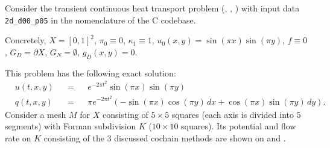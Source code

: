 \begin{example}
  \label{cmc/diffusion/continuous/transient/examples/2d_d00_p05-example}
  Consider the transient continuous heat transport problem
  (,
   ,
   )
  with input data \verb|2d_d00_p05| in the nomenclature of the C codebase.

  Concretely,
    $X = [0, 1]^2$,
    $\pi_0 \equiv 0$,
    $\kappa_1 \equiv 1$,
    $u_0(x, y) = \sin(\pi x) \sin(\pi y)$,
    $f \equiv 0$,
    $G_D = \partial X$,
    $G_N = \emptyset$,
    $g_D(x, y) = 0$.

  This problem has the following exact solution:
  \begin{subequations}
    \begin{alignat}{3}
      & u(t, x, y) && = && e^{-2 \pi t^2} \sin(\pi x) \sin(\pi y) \\
      & q(t, x, y) && =
      && \pi e^{-2 \pi t^2}
         (-\sin(\pi x) \cos(\pi y)\, d x + \cos(\pi x) \sin(\pi y)\, d y).
    \end{alignat}
  \end{subequations}
  Consider a mesh $M$ for $X$ consisting of $5 \times 5$ squares (each axis is
  divided into $5$ segments) with Forman subdivision $K$
  ($10 \times 10$ squares).
  Its potential and flow rate on $K$ consisting of the $3$ discussed cochain
  methods are shown on
  and
  .
\end{example}
